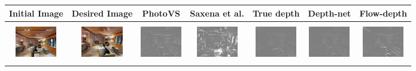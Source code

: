 \documentclass[letterpaper, 10 pt, conference]{ieeeconf}  %
\begin{document}
\begin{figure}[h!]
\begin{center}


\begin{tabular}{|c| c |c | c | c | c | c|}
\hline
 Initial Image &Desired Image&PhotoVS&Saxena et al.\cite{servonet}& True depth &  Depth-net & Flow-depth  \\ \hline
\hline \hline
\includegraphics[width=18mm, height=17mm]{TrueDepth/ROANE/init.png} &   
            \includegraphics[width=18mm, height=17mm]{TrueDepth/ROANE/des.png} & 
            \includegraphics[width=18mm, height=17mm]{PhotoVS/ROANE/ferror.png} & 
          \includegraphics[width=18mm, height=17mm]{ICRA17/ROANE/ferror.png} & 
 \includegraphics[width=18mm, height=17mm]{TrueDepth/ROANE/ferror.png} &
  \includegraphics[width=18mm, height=17mm]{DepthNetwork/ROANE/ferror.png} &
  \includegraphics[width=18mm, height=17mm]{FlowDepth/ROANE/ferror.png}


\end{tabular}
\end{center}
\end{figure}
\end{document}
